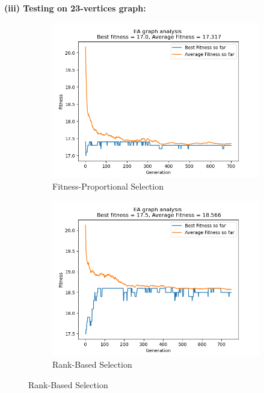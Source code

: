 \documentclass[conference,compsoc]{IEEEtran}
\begin{document}
\newpage
\begin{center}
  \textbf{(iii) Testing on 23-vertices graph:}
\end{center}
\begin{figure}[h!]
  \centering 
  \begin{subfigure}{0.34\textwidth}
    \includegraphics[width=\linewidth]{../Results/_23_FPS_Truncation_100_50_700.png}
    \caption{Fitness-Proportional Selection}
  \end{subfigure}
  \begin{subfigure}{0.34\textwidth}
    \includegraphics[width=\linewidth]{../Results/_23_RBS_Truncation_100_50_750.png}
    \caption{Rank-Based Selection}
  \end{subfigure}
  \label{fig:graphs2}
\end{figure}
\end{document}
